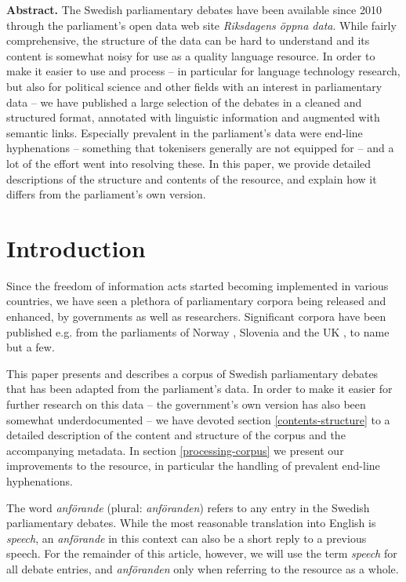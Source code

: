 \UseRawInputEncoding


\textbf{Abstract.} The Swedish parliamentary debates have been available since 2010 through the parliament's open data web site \emph{Riksdagens öppna data}. While fairly comprehensive, the structure of the data can be hard to understand and its content is somewhat noisy for use as a quality language resource. In order to make it easier to use and process -- in particular for language technology research, but also for political science and other fields with an interest in parliamentary data -- we have published a large selection of the debates in a cleaned and structured format, annotated with linguistic information and augmented with semantic links. Especially prevalent in the parliament's data were end-line hyphenations -- something that tokenisers generally are not equipped for -- and a lot of the effort went into resolving these. In this paper, we provide detailed descriptions of the structure and contents of the resource, and explain how it differs from the parliament's own version.


\section{Introduction}

Since the freedom of information acts started becoming implemented in various countries, we have seen a plethora of parliamentary corpora being released and enhanced, by governments as well as researchers. Significant corpora have been published e.g. from the parliaments of Norway \cite{lapponi_talk_2018}, Slovenia \cite{pancur_slovparl_2018} and the UK \cite{nanni_ukparl_2018}, to name but a few.

This paper presents and describes a corpus of Swedish parliamentary debates that has been adapted from the parliament's data. In order to make it easier for further research on this data -- the government's own version has also been somewhat underdocumented -- we have devoted section \ref{contents-structure} to a detailed description of the content and structure of the corpus and the accompanying metadata. In section \ref{processing-corpus} we present our improvements to the resource, in particular the handling of prevalent end-line hyphenations.

The word \emph{anförande} (plural: \emph{anföranden}) refers to any entry in the Swedish parliamentary debates. While the most reasonable translation into English is \emph{speech}, an \emph{anförande} in this context can also be a short reply to a previous speech. For the remainder of this article, however, we will use the term \emph{speech} for all debate entries, and \emph{anföranden} only when referring to the resource as a whole.

